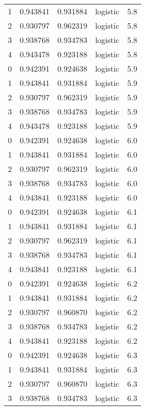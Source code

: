 \begin{tabular}{rrrlr}
     1 & 0.943841 & 0.931884 & logistic &        5.8 \\
     2 & 0.930797 & 0.962319 & logistic &        5.8 \\
     3 & 0.938768 & 0.934783 & logistic &        5.8 \\
     4 & 0.943478 & 0.923188 & logistic &        5.8 \\
     0 & 0.942391 & 0.924638 & logistic &        5.9 \\
     1 & 0.943841 & 0.931884 & logistic &        5.9 \\
     2 & 0.930797 & 0.962319 & logistic &        5.9 \\
     3 & 0.938768 & 0.934783 & logistic &        5.9 \\
     4 & 0.943478 & 0.923188 & logistic &        5.9 \\
     0 & 0.942391 & 0.924638 & logistic &        6.0 \\
     1 & 0.943841 & 0.931884 & logistic &        6.0 \\
     2 & 0.930797 & 0.962319 & logistic &        6.0 \\
     3 & 0.938768 & 0.934783 & logistic &        6.0 \\
     4 & 0.943841 & 0.923188 & logistic &        6.0 \\
     0 & 0.942391 & 0.924638 & logistic &        6.1 \\
     1 & 0.943841 & 0.931884 & logistic &        6.1 \\
     2 & 0.930797 & 0.962319 & logistic &        6.1 \\
     3 & 0.938768 & 0.934783 & logistic &        6.1 \\
     4 & 0.943841 & 0.923188 & logistic &        6.1 \\
     0 & 0.942391 & 0.924638 & logistic &        6.2 \\
     1 & 0.943841 & 0.931884 & logistic &        6.2 \\
     2 & 0.930797 & 0.960870 & logistic &        6.2 \\
     3 & 0.938768 & 0.934783 & logistic &        6.2 \\
     4 & 0.943841 & 0.923188 & logistic &        6.2 \\
     0 & 0.942391 & 0.924638 & logistic &        6.3 \\
     1 & 0.943841 & 0.931884 & logistic &        6.3 \\
     2 & 0.930797 & 0.960870 & logistic &        6.3 \\
     3 & 0.938768 & 0.934783 & logistic &        6.3 \\

\end{tabular}
